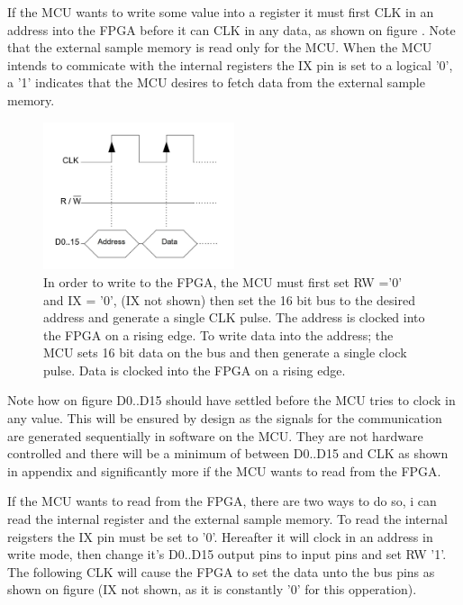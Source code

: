 If the MCU wants to write some value into a register it must first CLK in an address into the FPGA before it can CLK in any data, as shown on figure . Note that the external sample memory is read only for the MCU. When the MCU intends to commicate with the internal registers the IX pin is set to a logical '0', a '1' indicates that the MCU desires to fetch data from the external sample memory.
\begin{figure}[H]
    \centering
    \includegraphics[clip, trim=0 45 0 0, width=0.5\textwidth]{Sections/7_SystemDesign/Figures/7_2_1_CommWrite.pdf}
    \caption{In order to write to the FPGA, the MCU must first set RW ='0' and IX = '0', (IX not shown) then set the 16 bit bus to the desired address and generate a single CLK pulse. The address is clocked into the FPGA on a rising edge. To write data into the address; the MCU sets 16 bit data on the bus and then generate a single clock pulse. Data is clocked into the FPGA on a rising edge.}
    \label{fig_7_2_1_CommWrite}
\end{figure}

Note how on figure  D0..D15 should have settled before the MCU tries to clock in any value. This will be ensured by design as the signals for the communication are generated sequentially in software on the MCU. They are not hardware controlled and there will be a minimum of  between D0..D15 and CLK as shown in appendix  and significantly more if the MCU wants to read from the FPGA.

If the MCU wants to read from the FPGA, there are two ways to do so, i can read the internal register and the external sample memory. To read the internal reigsters the IX pin must be set to '0'. Hereafter it will clock in an address in write mode, then change it's D0..D15 output pins to input pins and set RW '1'. The following CLK will cause the FPGA to set the data unto the bus pins as shown on figure  (IX not shown, as it is constantly '0' for this opperation). 

